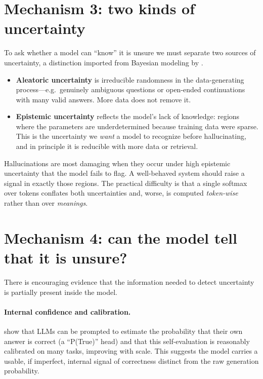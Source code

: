 \documentclass[11pt]{article}
\begin{document}
\section{Mechanism 3: two kinds of uncertainty}
To ask whether a model can ``know'' it is unsure we must separate two sources of uncertainty, a distinction imported from Bayesian modeling by \citet{kendall2017uncertainties}.
\begin{itemize}[leftmargin=*]
  \item \textbf{Aleatoric uncertainty} is irreducible randomness in the data-generating process---e.g.\ genuinely ambiguous questions or open-ended continuations with many valid answers. More data does not remove it.
  \item \textbf{Epistemic uncertainty} reflects the model's lack of knowledge: regions where the parameters are underdetermined because training data were sparse. This is the uncertainty we \emph{want} a model to recognize before hallucinating, and in principle it is reducible with more data or retrieval.
\end{itemize}
Hallucinations are most damaging when they occur under high epistemic uncertainty that the model fails to flag. A well-behaved system should raise a signal in exactly those regions. The practical difficulty is that a single softmax over tokens conflates both uncertainties and, worse, is computed \emph{token-wise} rather than over \emph{meanings}.

\section{Mechanism 4: can the model tell that it is unsure?}
There is encouraging evidence that the information needed to detect uncertainty is partially present inside the model.

\paragraph{Internal confidence and calibration.} \citet{kadavath2022know} show that LLMs can be prompted to estimate the probability that their own answer is correct (a ``P(True)'' head) and that this self-evaluation is reasonably calibrated on many tasks, improving with scale. This suggests the model carries a usable, if imperfect, internal signal of correctness distinct from the raw generation probability.
\end{document}
